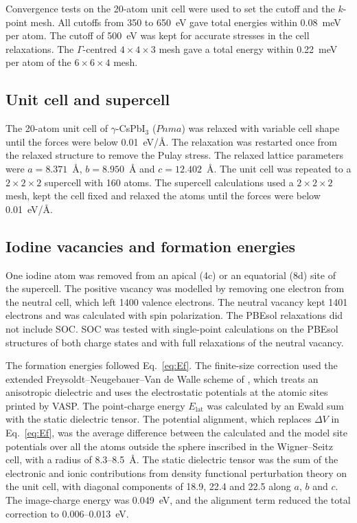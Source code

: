 Convergence tests on the 20-atom unit cell were used to set the cutoff and the $k$-point mesh. All cutoffs from 350 to 650~eV gave total energies within 0.08~meV per atom. The cutoff of 500~eV was kept for accurate stresses in the cell relaxations. The $\Gamma$-centred $4\times4\times3$ mesh gave a total energy within 0.22~meV per atom of the $6\times6\times4$ mesh.

\subsection{Unit cell and supercell}

The 20-atom unit cell of $\gamma$-CsPbI$_3$ ($Pnma$) was relaxed with variable cell shape until the forces were below 0.01~eV/\AA. The relaxation was restarted once from the relaxed structure to remove the Pulay stress. The relaxed lattice parameters were $a = 8.371$~\AA, $b = 8.950$~\AA{} and $c = 12.402$~\AA. The unit cell was repeated to a $2\times2\times2$ supercell with 160 atoms. The supercell calculations used a $2\times2\times2$ mesh, kept the cell fixed and relaxed the atoms until the forces were below 0.01~eV/\AA.

\subsection{Iodine vacancies and formation energies}

One iodine atom was removed from an apical (4c) or an equatorial (8d) site of the supercell. The positive vacancy was modelled by removing one electron from the neutral cell, which left 1400 valence electrons. The neutral vacancy kept 1401 electrons and was calculated with spin polarization. The PBEsol relaxations did not include SOC. SOC was tested with single-point calculations on the PBEsol structures of both charge states and with full relaxations of the neutral vacancy.

The formation energies followed Eq.~\ref{eq:Ef}. The finite-size correction used the extended Freysoldt--Neugebauer--Van de Walle scheme of \citet{Kumagai2014}, which treats an anisotropic dielectric and uses the electrostatic potentials at the atomic sites printed by VASP. The point-charge energy $E_\mathrm{lat}$ was calculated by an Ewald sum with the static dielectric tensor. The potential alignment, which replaces $\Delta V$ in Eq.~\ref{eq:Ef}, was the average difference between the calculated and the model site potentials over all the atoms outside the sphere inscribed in the Wigner--Seitz cell, with a radius of 8.3--8.5~\AA. The static dielectric tensor was the sum of the electronic and ionic contributions from density functional perturbation theory on the unit cell, with diagonal components of 18.9, 22.4 and 22.5 along $a$, $b$ and $c$. The image-charge energy was 0.049~eV, and the alignment term reduced the total correction to 0.006--0.013~eV.

